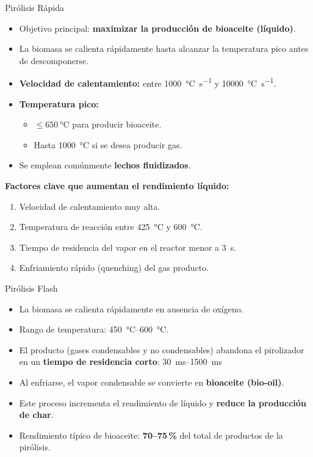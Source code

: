 \documentclass[../../main.tex]{subfiles}
\begin{document}
\begin{frame}{Pirólisis Rápida}
\footnotesize
\begin{itemize}
  \item Objetivo principal: \textbf{maximizar la producción de bioaceite (líquido)}.
  \item La biomasa se calienta rápidamente hasta alcanzar la temperatura pico antes de descomponerse.
  \item \textbf{Velocidad de calentamiento:} entre \SI{1000}{\degreeCelsius\per\second} y \SI{10000}{\degreeCelsius\per\second}.
  \item \textbf{Temperatura pico:}
  \begin{itemize}
    \item $\leq \SI{650}{\degreeCelsius}$ para producir bioaceite.
    \item Hasta \SI{1000}{\degreeCelsius} si se desea producir gas.
  \end{itemize}
  \item Se emplean comúnmente \textbf{lechos fluidizados}.
\end{itemize}

\textbf{Factores clave que aumentan el rendimiento líquido:}
\begin{enumerate}
  \item Velocidad de calentamiento muy alta.
  \item Temperatura de reacción entre \SI{425}{\degreeCelsius} y \SI{600}{\degreeCelsius}.
  \item Tiempo de residencia del vapor en el reactor menor a \SI{3}{\second}.
  \item Enfriamiento rápido (quenching) del gas producto.
\end{enumerate}
\end{frame}
\begin{frame}{Pirólisis Flash}
\small
\begin{itemize}
  \item La biomasa se calienta rápidamente en ausencia de oxígeno.
  \item Rango de temperatura: \SI{450}{\degreeCelsius}–\SI{600}{\degreeCelsius}.
  \item El producto (gases condensables y no condensables) abandona el pirolizador en un \textbf{tiempo de residencia corto}: \SI{30}{ms}–\SI{1500}{ms} %
  \item Al enfriarse, el vapor condensable se convierte en \textbf{bioaceite (bio-oil)}.
  \item Este proceso incrementa el rendimiento de líquido y \textbf{reduce la producción de char}.
  \item Rendimiento típico de bioaceite: \textbf{70–75\,\%} del total de productos de la pirólisis.
\end{itemize}
\end{frame}
\end{document}
